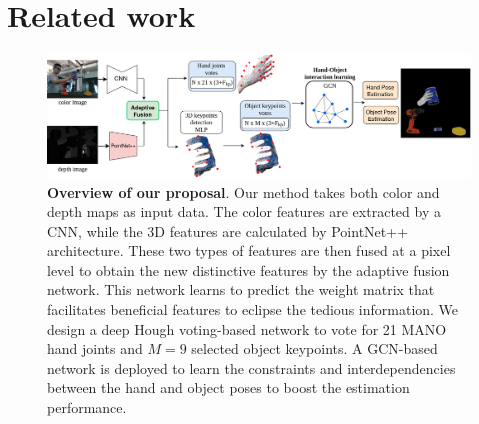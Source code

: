 \section{Related work}
\label{sec:relatedwork}

\begin{figure}[t]
	\centering
	\includegraphics[width=0.95\linewidth]{Figs/Hand-Object_pose.png}
	\caption{\textbf{Overview of our proposal}. Our method takes both color and depth maps as input data. The color features are extracted by a CNN, while the 3D features are calculated by PointNet++ architecture. These two types of features are then fused at a pixel level to obtain the new distinctive features by the adaptive fusion network. This network learns to predict the weight matrix that facilitates beneficial features to eclipse the tedious information. We design a deep Hough voting-based network to vote for 21 MANO hand joints and $M=9$ selected object keypoints. A GCN-based network is deployed to learn the constraints and interdependencies between the hand and object poses to boost the estimation performance.}
	\label{fig:Hand_pose}
\end{figure}


